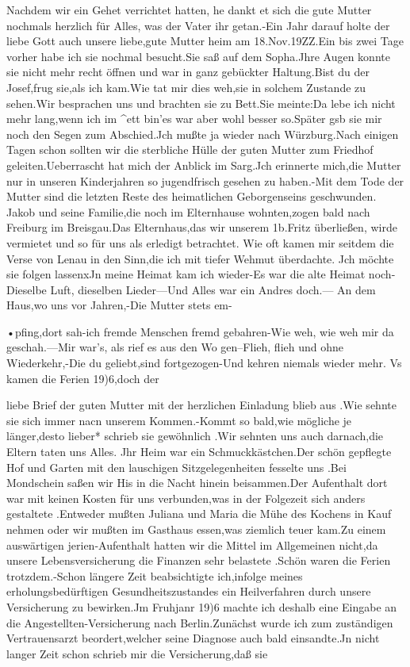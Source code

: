 \documentclass[a4paper,11pt]{article}
\begin{document}
Nachdem wir ein Gehet verrichtet hatten, he dankt et sich die gute Mutter nochmals herzlich für Alles, was der Vater ihr getan.-Ein Jahr darauf holte der liebe Gott auch unsere liebe,gute Mutter heim am 18.Nov.19ZZ.Ein bis zwei Tage vorher habe ich sie nochmal besucht.Sie saß auf dem Sopha.Jhre Augen konnte sie nicht mehr recht öffnen und war in ganz gebückter Haltung.Bist du der Josef,frug sie,als ich kam.Wie tat mir dies weh,sie in solchem Zustande zu sehen.Wir besprachen uns und brachten sie zu Bett.Sie meinte:Da lebe ich nicht mehr lang,wenn ich im ^ett bin’es war aber wohl besser so.Später gsb sie mir noch den Segen zum Abschied.Jch mußte ja wieder nach Würzburg.Nach einigen Tagen schon sollten wir die sterbliche Hülle der guten Mutter zum Friedhof geleiten.Ueberrascht hat mich der Anblick im Sarg.Jch erinnerte mich,die Mutter nur in unseren Kinderjahren so jugendfrisch gesehen zu haben.-Mit dem Tode der Mutter sind die letzten Reste des heimatlichen Geborgenseins geschwunden. Jakob und seine Familie,die noch im Elternhause wohnten,zogen bald nach Freiburg im Breisgau.Das Elternhaus,das wir unserem 1b.Fritz überließen, wirde vermietet und so für uns als erledigt betrachtet. Wie oft kamen mir seitdem die Verse von Lenau in den Sinn,die ich mit tiefer Wehmut überdachte. Jch möchte sie folgen lassenxJn meine Heimat kam ich wieder-Es war die alte Heimat noch-Dieselbe Luft, dieselben Lieder—Und Alles war ein Andres doch.— An dem Haus,wo uns vor Jahren,-Die Mutter stets em-

•pfing,dort sah-ich fremde Menschen fremd gebahren-Wie weh, wie weh mir da geschah.—Mir war's, als rief es aus den Wo gen--Flieh, flieh und ohne Wiederkehr,-Die du geliebt,sind fortgezogen-Und kehren niemals wieder mehr.	Vs kamen die Ferien 19)6,doch der

liebe Brief der guten Mutter mit der herzlichen Einladung blieb aus .Wie sehnte sie sich immer nacn unserem Kommen.-Kommt so bald,wie mögliche je länger,desto lieber* schrieb sie gewöhnlich .Wir sehnten uns auch darnach,die Eltern taten uns Alles. Jhr Heim war ein Schmuckkästchen.Der schön gepflegte Hof und Garten mit den lauschigen Sitzgelegenheiten fesselte uns .Bei Mondschein saßen wir His in die Nacht hinein beisammen.Der Aufenthalt dort war mit keinen Kosten für uns verbunden,was in der Folgezeit sich anders gestaltete .Entweder mußten Juliana und Maria die Mühe des Kochens in Kauf nehmen oder wir mußten im Gasthaus essen,was ziemlich teuer kam.Zu einem auswärtigen jerien-Aufenthalt hatten wir die Mittel im Allgemeinen nicht,da unsere Lebensversicherung die Finanzen sehr belastete .Schön waren die Ferien trotzdem.-Schon längere Zeit beabsichtigte ich,infolge meines erholungsbedürftigen Gesundheitszustandes ein Heilverfahren durch unsere Versicherung zu bewirken.Jm Fruhjanr 19)6 machte ich deshalb eine Eingabe an die Angestellten-Versicherung nach Berlin.Zunächst wurde ich zum zuständigen Vertrauensarzt beordert,welcher seine Diagnose auch bald einsandte.Jn nicht langer Zeit schon schrieb mir die Versicherung,daß sie
\end{document}
